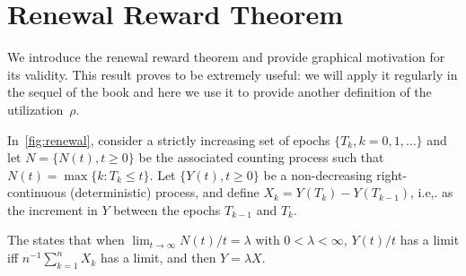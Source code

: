 

\section{Renewal Reward Theorem}
\label{sec:renew-reward-theor}


We introduce  the renewal reward theorem and provide graphical motivation for its validity.
This result proves to be extremely useful: we will apply it regularly in the sequel of the book and here we use it to provide another definition of the utilization~$\rho$. 


In~\cref{fig:renewal},  consider a strictly increasing set of epochs $\{T_k, k=0, 1, \ldots\}$ and 
let $N=\{N(t), t\geq 0\}$ be the associated counting process such that  $N(t) = \max\{k : T_k \leq t\}$.
Let $\{Y(t), t\geq 0\}$ be a non-decreasing right-continuous (deterministic) process, and define $X_k = Y(T_k)-Y(T_{k-1})$, i.e,.
as the increment
in $Y$ between the epochs $T_{k-1}$ and $T_k$.

The  states that when $\lim_{t\to\infty} N(t)/t = \lambda$ with $0<\lambda < \infty$, $Y(t)/t$ has a limit iff $n^{-1}\sum_{k=1}^n X_k$ has a limit, and then $Y=\lambda X$.




